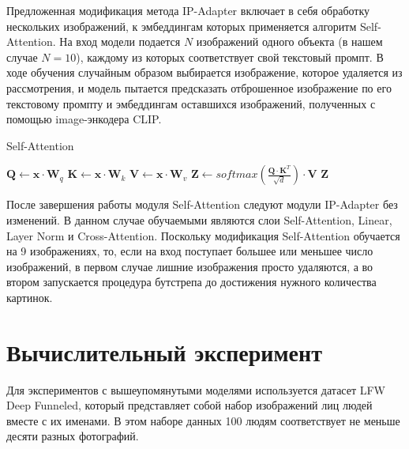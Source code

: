 \documentclass{article}
\begin{document}
Предложенная модификация метода IP-Adapter включает в себя обработку нескольких изображений, к эмбеддингам которых применяется алгоритм Self-Attention\cite{DBLP:journals/corr/VaswaniSPUJGKP17}. На вход модели подается $N$ изображений одного объекта (в нашем случае $N = 10$), каждому из которых соответствует свой текстовый промпт. В ходе обучения случайным образом выбирается изображение, которое удаляется из рассмотрения, и модель пытается предсказать отброшенное изображение по его текстовому промпту и эмбеддингам оставшихся изображений, полученных с помощью image-энкодера CLIP.

\begin{algorithm}
\caption{Self-Attention}
\label{self_attention}
\begin{algorithmic}
    \State $\mathbf{Q} \gets \mathbf{x} \cdot \mathbf{W}_{q}$
    \State $\mathbf{K} \gets \mathbf{x} \cdot \mathbf{W}_{k}$
    \State $\mathbf{V} \gets \mathbf{x} \cdot \mathbf{W}_{v}$
    \State $\mathbf{Z} \gets \text{$softmax$}\left(\frac{\mathbf{Q} \cdot \mathbf{K}^T}{\sqrt{d}}\right) \cdot \mathbf{V}$
    \State \Return $\mathbf{Z}$
\EndProcedure
\end{algorithmic}
\end{algorithm}

После завершения работы модуля Self-Attention следуют модули IP-Adapter без изменений. В данном случае обучаемыми являются слои Self-Attention, Linear, Layer Norm и Cross-Attention. Поскольку модификация Self-Attention обучается на 9 изображениях, то, если на вход поступает большее или меньшее число изображений, в первом случае лишние изображения просто удаляются, а во втором запускается процедура бутстрепа до достижения нужного количества картинок.

\section{Вычислительный эксперимент}
Для экспериментов с вышеупомянутыми моделями используется датасет LFW Deep Funneled, который представляет собой набор изображений лиц людей вместе с их именами. В этом наборе данных 100 людям соответствует не меньше десяти разных фотографий. 
\end{document}

